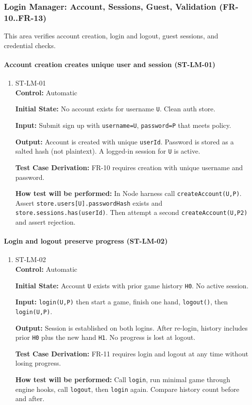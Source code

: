 \documentclass[12pt, titlepage]{article}
\begin{document}
\subsubsection{Login Manager: Account, Sessions, Guest, Validation (FR-10..FR-13)}

This area verifies account creation, login and logout, guest sessions, and credential checks.

\paragraph{Account creation creates unique user and session (ST-LM-01)}
\begin{enumerate}
\item{ST-LM-01\\}
\textbf{Control:} Automatic

\textbf{Initial State:} No account exists for username \texttt{U}. Clean auth store.

\textbf{Input:} Submit sign up with \texttt{username=U}, \texttt{password=P} that meets policy.

\textbf{Output:} Account is created with unique \texttt{userId}. Password is stored as a salted hash (not plaintext). A logged-in session for \texttt{U} is active.

\textbf{Test Case Derivation:} FR-10 requires creation with unique username and password.

\textbf{How test will be performed:} In Node harness call \texttt{createAccount(U,P)}. Assert \texttt{store.users[U].passwordHash} exists and \texttt{store.sessions.has(userId)}. Then attempt a second \texttt{createAccount(U,P2)} and assert rejection.
\end{enumerate}

\paragraph{Login and logout preserve progress (ST-LM-02)}
\begin{enumerate}
\item{ST-LM-02\\}
\textbf{Control:} Automatic

\textbf{Initial State:} Account \texttt{U} exists with prior game history \texttt{H0}. No active session.

\textbf{Input:} \texttt{login(U,P)} then start a game, finish one hand, \texttt{logout()}, then \texttt{login(U,P)}.

\textbf{Output:} Session is established on both logins. After re-login, history includes prior \texttt{H0} plus the new hand \texttt{H1}. No progress is lost at logout.

\textbf{Test Case Derivation:} FR-11 requires login and logout at any time without losing progress.

\textbf{How test will be performed:} Call \texttt{login}, run minimal game through engine hooks, call \texttt{logout}, then \texttt{login} again. Compare history count before and after.
\end{enumerate}
\end{document}

